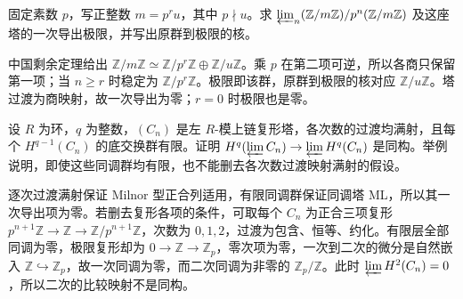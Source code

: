 \begin{exercise}\label{b4:ex:13-completion-finite-cyclic}
	固定素数 \(p\)，写正整数 \(m=p^ru\)，其中 \(p\nmid u\)。求 \(\varprojlim_n(\mathbb Z/m\mathbb Z)/p^n(\mathbb Z/m\mathbb Z)\) 及这座塔的一次导出极限，并写出原群到极限的核。
\end{exercise}
\begin{solution}
	中国剩余定理给出 \(\mathbb Z/m\mathbb Z\simeq\mathbb Z/p^r\mathbb Z\oplus\mathbb Z/u\mathbb Z\)。乘 \(p\) 在第二项可逆，所以各商只保留第一项；当 \(n\ge r\) 时稳定为 \(\mathbb Z/p^r\mathbb Z\)。极限即该群，原群到极限的核对应 \(\mathbb Z/u\mathbb Z\)。塔过渡为商映射，故一次导出为零；\(r=0\) 时极限也是零。
\end{solution}

\begin{exercise}\label{b4:ex:13-milnor-finite-cohomology}
	设 \(R\) 为环，\(q\) 为整数，\((C_n)\) 是左 \(R\)-模上链复形塔，各次数的过渡均满射，且每个 \(H^{q-1}(C_n)\) 的底交换群有限。证明 \(H^q(\varprojlim C_n)\to\varprojlim H^q(C_n)\) 是同构。举例说明，即使这些同调群均有限，也不能删去各次数过渡映射满射的假设。
\end{exercise}
\begin{solution}
	逐次过渡满射保证 Milnor 型正合列适用，有限同调群保证同调塔 ML，所以其一次导出项为零。若删去复形各项的条件，可取每个 \(C_n\) 为正合三项复形 \(p^{n+1}\mathbb Z\to\mathbb Z\to\mathbb Z/p^{n+1}\mathbb Z\)，次数为 \(0,1,2\)，过渡为包含、恒等、约化。有限层全部同调为零，极限复形却为 \(0\to\mathbb Z\to\mathbb Z_p\)，零次项为零，一次到二次的微分是自然嵌入 \(\mathbb Z\hookrightarrow\mathbb Z_p\)，故一次同调为零，而二次同调为非零的 \(\mathbb Z_p/\mathbb Z\)。此时 \(\varprojlim H^2(C_n)=0\)，所以二次的比较映射不是同构。
\end{solution}

